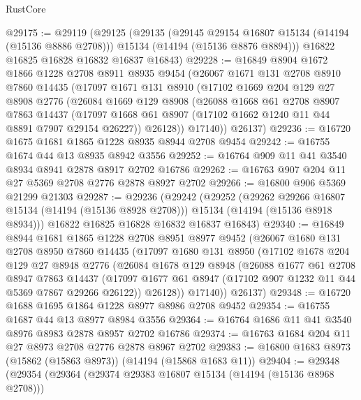 \begin{lexlean}{RustCore}
\begin{coremodule}
@29175 := @29119
    (@29125
      (@29135
        (@29145 @29154 @16807 @15134 (@14194 (@15136 @8886 @2708)))
        @15134
        (@14194 (@15136 @8876 @8894)))
      @16822
      @16825
      @16828
      @16832
      @16837
      @16843)
@29228 := @16849
    @8904
    @1672
    @1866
    @1228
    @2708
    @8911
    @8935
    @9454
    (@26067
      @1671
      @131
      @2708
      @8910
      @7860
      @14435
      (@17097
        @1671
        @131
        @8910
        (@17102
          @1669
          @204
          @129
          @27
          @8908
          @2776
          (@26084
            @1669
            @129
            @8908
            (@26088
              @1668
              @61
              @2708
              @8907
              @7863
              @14437
              (@17097 @1668 @61 @8907 (@17102 @1662 @1240 @11 @44 @8891 @7907 @29154 @26227))
              @26128))
          @17140))
      @26137)
@29236 := @16720 @1675 @1681 @1865 @1228 @8935 @8944 @2708 @9454
@29242 := @16755 @1674 @44 @13 @8935 @8942 @3556
@29252 := @16764 @909 @11 @41 @3540 @8934 @8941 @2878 @8917 @2702 @16786
@29262 := @16763 @907 @204 @11 @27 @5369 @2708 @2776 @2878 @8927 @2702
@29266 := @16800 @906 @5369 @21299 @21303
@29287 := @29236
    (@29242
      (@29252
        (@29262 @29266 @16807 @15134 (@14194 (@15136 @8928 @2708)))
        @15134
        (@14194 (@15136 @8918 @8934)))
      @16822
      @16825
      @16828
      @16832
      @16837
      @16843)
@29340 := @16849
    @8944
    @1681
    @1865
    @1228
    @2708
    @8951
    @8977
    @9452
    (@26067
      @1680
      @131
      @2708
      @8950
      @7860
      @14435
      (@17097
        @1680
        @131
        @8950
        (@17102
          @1678
          @204
          @129
          @27
          @8948
          @2776
          (@26084
            @1678
            @129
            @8948
            (@26088
              @1677
              @61
              @2708
              @8947
              @7863
              @14437
              (@17097 @1677 @61 @8947 (@17102 @907 @1232 @11 @44 @5369 @7867 @29266 @26122))
              @26128))
          @17140))
      @26137)
@29348 := @16720 @1688 @1695 @1864 @1228 @8977 @8986 @2708 @9452
@29354 := @16755 @1687 @44 @13 @8977 @8984 @3556
@29364 := @16764 @1686 @11 @41 @3540 @8976 @8983 @2878 @8957 @2702 @16786
@29374 := @16763 @1684 @204 @11 @27 @8973 @2708 @2776 @2878 @8967 @2702
@29383 := @16800 @1683 @8973 (@15862 (@15863 @8973)) (@14194 (@15868 @1683 @11))
@29404 := @29348
    (@29354
      (@29364
        (@29374 @29383 @16807 @15134 (@14194 (@15136 @8968 @2708)))

\end{coremodule}
\end{lexlean}
